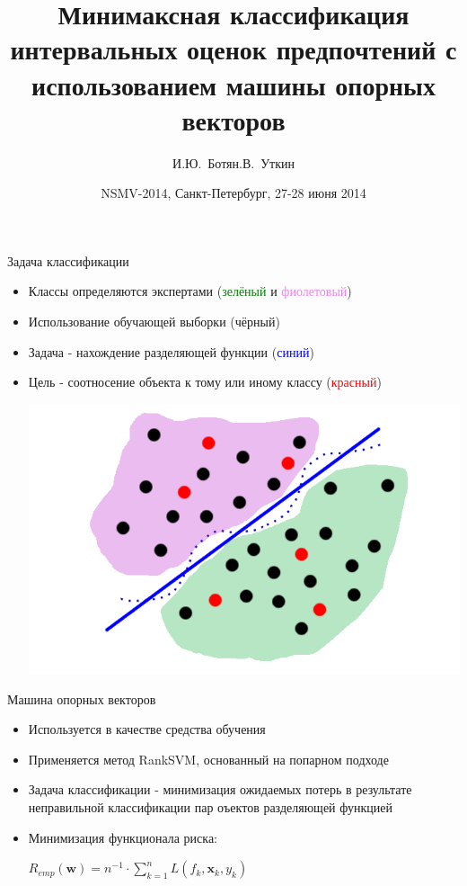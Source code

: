 \documentclass[11pt]{beamer}
\title[]{Минимаксная классификация интервальных оценок предпочтений с использованием машины опорных векторов}
\author[И.Ю.~Ботян, Л.В.~Уткин]{И.Ю.~Ботян\andЛ.В.~Уткин}
\institute[СПбГЛТУ]{\large Санкт-Петербургский государственный лесотехнический университет}
\date[NSMV-2014]{\large NSMV-2014, Санкт-Петербург, 27-28 июня 2014}
\begin{document}
\graphicspath{ {./img/} }

\begin{frame}

\titlepage

\end{frame}
\begin{frame}{Задача классификации}

\begin{itemize}
	\item Классы определяются экспертами (\textcolor{green}{зелёный} и \textcolor{violet}{фиолетовый})
	\item Использование обучающей выборки (чёрный)
	\item Задача - нахождение разделяющей функции (\textcolor{blue}{синий})
	\item Цель - соотносение объекта к тому или иному классу (\textcolor{red}{красный})
	\begin{center}
		\includegraphics[scale=0.35]{classification}
	\end{center}
\end{itemize}

\end{frame}
\begin{frame}{Машина опорных векторов}

\begin{itemize}
	\item Используется в качестве средства обучения
	\item Применяется метод RankSVM, основанный на попарном подходе
	\item Задача классификации - минимизация ожидаемых потерь в результате неправильной классификации пар оъектов разделяющей функцией \linebreak
	\item Минимизация функционала риска:
	\begin{center}
	\(R_{emp}(\mathbf{w}) = n^{-1} \cdot \sum \limits_{k=1}^n L(f_k, \mathbf{x}_k, y_k)\)
	\end{center}
\end{itemize}

\end{frame}
\end{document}

